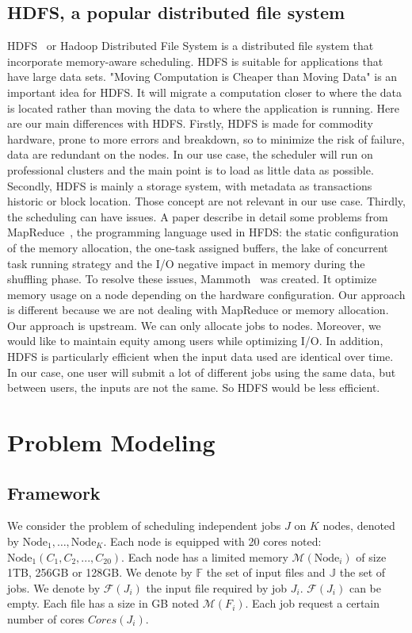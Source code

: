 \documentclass[a4paper]{article}
\newcommand{\Node}[1]{\ensuremath{\mathrm{Node}_{#1}}\xspace}
\newcommand{\inputs}{\ensuremath{\mathcal{F}}\xspace}
\newcommand{\memory}{\ensuremath{\mathcal{M}}\xspace}
\newcommand{\core}{\mathit{Cores}\xspace}
\newcommand{\fileset}{\ensuremath{\mathbb{F}}\xspace}
\newcommand{\jobset}{\ensuremath{\mathbb{J}}\xspace}
\begin{document}
\subsection{HDFS, a popular distributed file system}
HDFS~\cite{hdfs} or Hadoop Distributed File System is a distributed file system that incorporate memory-aware scheduling.
HDFS is suitable for applications that have large data sets. 
"Moving Computation is Cheaper than Moving Data" is an important idea for HDFS.
It will migrate a computation closer to where the data is located rather than moving the data to where
the application is running.
Here are our main differences with HDFS. Firstly, HDFS is made for commodity hardware, prone
to more errors and breakdown, so to minimize the risk of failure, data are redundant on the nodes.
In our use case, the scheduler will run on professional clusters and the main point is to load as 
little data as possible. Secondly, HDFS is mainly a storage system, with metadata as transactions historic or
block location. Those concept are not relevant in our use case. Thirdly, the scheduling 
can have issues. A paper describe in detail some problems from MapReduce~\cite{issue_with_hdfs}, the
programming language used in HFDS: the static configuration of the memory allocation, the one-task assigned buffers, the
lake of concurrent task running strategy and the I/O negative impact in memory during the shuffling phase.
To resolve these issues, Mammoth~\cite{Mammoth} was created. It optimize memory usage on a node depending on the hardware configuration.
Our approach is different because we are not dealing with MapReduce or memory allocation.
Our approach is upstream. We can only allocate jobs to nodes. Moreover, we would like to maintain
equity among users  while optimizing I/O.
In addition, HDFS is particularly efficient when the input data used are identical over time.
In our case, one user will submit a lot of different jobs using the same data, but between users,
the inputs are not the same. So HDFS would be less efficient.


\section{Problem Modeling}

\subsection{Framework}
We consider the problem of scheduling independent jobs $J$ on $K$ nodes,
denoted by $\Node{1},\ldots, \Node{K}$.
Each node is equipped with 20 cores noted: $\Node{1}(C_1, C_2, ..., C_{20})$.
Each node has a limited memory $\memory(\Node{i})$ of size 1TB, 256GB or 128GB.
We denote by $\fileset$ the set of input files and $\jobset$ the set of jobs.
We denote by $\inputs(J_i)$ the input file required by job $J_i$. $\inputs(J_i)$ can be empty.
Each file has a size in GB noted $\memory(F_i)$. 
Each job request a certain number of cores $\core(J_i)$. 
\end{document}
